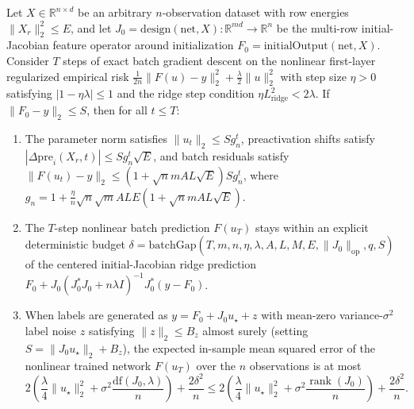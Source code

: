 \begin{lemma}\label{lem:mlp_batch_risk}
\leanok
{}
Let $X\in\mathbb{R}^{n\times d}$ be an arbitrary $n$-observation dataset with row energies $\|X_r\|_2^2\le E$, and let $J_0=\mathrm{design}(\mathrm{net},X):\mathbb{R}^{md}\to\mathbb{R}^n$ be the multi-row initial-Jacobian feature operator around initialization $F_0=\mathrm{initialOutput}(\mathrm{net},X)$. Consider $T$ steps of exact batch gradient descent on the nonlinear first-layer regularized empirical risk $\frac{1}{2n}\|F(u)-y\|_2^2+\frac{\lambda}{2}\|u\|_2^2$ with step size $\eta>0$ satisfying $|1-\eta\lambda|\le 1$ and the ridge step condition $\eta L_{\mathrm{ridge}}^2<2\lambda$. If $\|F_0-y\|_2\le S$, then for all $t\le T$:
\begin{enumerate}
\item The parameter norm satisfies $\|u_t\|_2\le S g_n^t$, preactivation shifts satisfy $|\Delta\mathrm{pre}_i(X_r,t)|\le S g_n^t\sqrt{E}$, and batch residuals satisfy $\|F(u_t)-y\|_2\le (1+\sqrt{n}m A L\sqrt{E})S g_n^t$, where $g_n=1+\frac{\eta}{n}\sqrt{n}\sqrt{m}A L E(1+\sqrt{n}m A L\sqrt{E})$.
\item The $T$-step nonlinear batch prediction $F(u_T)$ stays within an explicit deterministic budget $\delta=\mathrm{batchGap}(T,m,n,\eta,\lambda,A,L,M,E,\|J_0\|_{\mathrm{op}},q,S)$ of the centered initial-Jacobian ridge prediction $F_0+J_0(J_0^*J_0+n\lambda I)^{-1}J_0^*(y-F_0)$.
\item When labels are generated as $y=F_0+J_0 u_\star+z$ with mean-zero variance-$\sigma^2$ label noise $z$ satisfying $\|z\|_2\le B_z$ almost surely (setting $S=\|J_0 u_\star\|_2+B_z$), the expected in-sample mean squared error of the nonlinear trained network $F(u_T)$ over the $n$ observations is at most
\[
2\left(\frac{\lambda}{4}\|u_\star\|_2^2+\sigma^2\frac{\mathrm{df}(J_0,\lambda)}{n}\right)+\frac{2\delta^2}{n}
\le
2\left(\frac{\lambda}{4}\|u_\star\|_2^2+\sigma^2\frac{\operatorname{rank}(J_0)}{n}\right)+\frac{2\delta^2}{n}.
\]
\end{enumerate}
\end{lemma}
